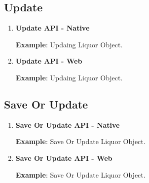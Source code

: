 	\subsection{Update}

		\begin{enumerate}
	
			\item \small \textbf{Update API - Native}

				

				\par
					\textbf{Example}: Updaing Liquor Object.
					


			\item \small \textbf{Update API - Web}
				

				\par
					\textbf{Example}: Updaing Liquor Object.
					

		\end{enumerate}



	\subsection{Save Or Update}

		\begin{enumerate}

			\item \small \textbf{Save Or Update API - Native}
				

				\par
					\textbf{Example}: Save Or Update Liquor Object.
					

			\item \small \textbf{Save Or Update API - Web}
				

				\par
					\textbf{Example}: Save Or Update Liquor Object.
					

		\end{enumerate}




